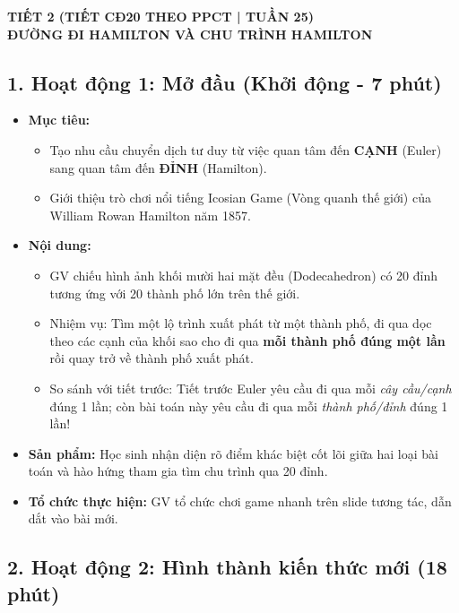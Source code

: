 \documentclass[12pt, a4paper]{article}
\begin{document}
\begin{center}
    \textbf{\large TIẾT 2 (TIẾT CĐ20 THEO PPCT | TUẦN 25)}\\[4pt]
    \textbf{\large ĐƯỜNG ĐI HAMILTON VÀ CHU TRÌNH HAMILTON}
\end{center}

\subsection*{1. Hoạt động 1: Mở đầu (Khởi động - 7 phút)}

\begin{itemize}[leftmargin=1.2cm]
    \item[a)] \textbf{Mục tiêu:}
    \begin{itemize}[leftmargin=0.6cm]
        \item Tạo nhu cầu chuyển dịch tư duy từ việc quan tâm đến \textbf{CẠNH} (Euler) sang quan tâm đến \textbf{ĐỈNH} (Hamilton).
        \item Giới thiệu trò chơi nổi tiếng Icosian Game (Vòng quanh thế giới) của William Rowan Hamilton năm 1857.
    \end{itemize}

    \item[b)] \textbf{Nội dung:}
    \begin{itemize}[leftmargin=0.6cm]
        \item GV chiếu hình ảnh khối mười hai mặt đều (Dodecahedron) có 20 đỉnh tương ứng với 20 thành phố lớn trên thế giới.
        \item Nhiệm vụ: Tìm một lộ trình xuất phát từ một thành phố, đi qua dọc theo các cạnh của khối sao cho đi qua \textbf{mỗi thành phố đúng một lần} rồi quay trở về thành phố xuất phát.
        \item So sánh với tiết trước: Tiết trước Euler yêu cầu đi qua mỗi \textit{cây cầu/cạnh} đúng 1 lần; còn bài toán này yêu cầu đi qua mỗi \textit{thành phố/đỉnh} đúng 1 lần!
    \end{itemize}

    \item[c)] \textbf{Sản phẩm:} Học sinh nhận diện rõ điểm khác biệt cốt lõi giữa hai loại bài toán và hào hứng tham gia tìm chu trình qua 20 đỉnh.
    \item[d)] \textbf{Tổ chức thực hiện:} GV tổ chức chơi game nhanh trên slide tương tác, dẫn dắt vào bài mới.
\end{itemize}

\subsection*{2. Hoạt động 2: Hình thành kiến thức mới (18 phút)}
\end{document}
